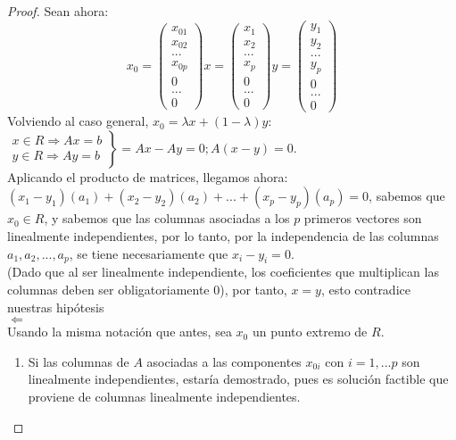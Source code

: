 \documentclass[11pt,fleqn]{book} %
\begin{document}
\begin{proof}
	Sean ahora:
	$$x_0=\left(\begin{array}{c}
	x_{01} \\
	x_{02} \\
	... \\
	x_{0p} \\
	0 \\
	... \\
	0
	\end{array}\right) x=\left(\begin{array}{c}
	x_{1} \\
	x_{2} \\
	... \\
	x_{p} \\
	0 \\
	... \\
	0
	\end{array}\right) y=\left(\begin{array}{c}
	y_{1} \\
	y_{2} \\
	... \\
	y_{p} \\
	0 \\
	... \\
	0
	\end{array}\right)$$
	Volviendo al caso general, $x_0=\lambda x + (1-\lambda)y$: \\
	$\left.\begin{array}{c}
		x \in R \Rightarrow Ax=b \\
		y \in R \Rightarrow Ay=b
	\end{array}\right\}=Ax-Ay=0; A(x-y)=0$. \\
	Aplicando el producto de matrices, llegamos ahora:\\ $(x_1-y_1)(a_1)+(x_2-y_2)(a_2)+...+(x_p-y_p)(a_p)=0$, sabemos que $x_0 \in R$, y sabemos que las columnas asociadas a los $p$ primeros vectores son linealmente independientes, por lo tanto, por la independencia de las columnas $a_1, a_2, ..., a_p$, se tiene necesariamente que $x_i-y_i=0$. \\(Dado que al ser linealmente independiente, los coeficientes que multiplican las columnas deben ser obligatoriamente 0), por tanto, $x=y$, esto contradice nuestras hipótesis \\
	$\Leftarrow$ \\
	Usando la misma notación que antes, sea $x_0$ un punto extremo de $R$.
	\begin{enumerate}
		\item Si las columnas de $A$ asociadas a las componentes $x_{0i}$ con $i=1,...p$ son linealmente independientes, estaría demostrado, pues es solución factible que proviene de columnas linealmente independientes.

\end{enumerate}
\end{proof}
\end{document}
